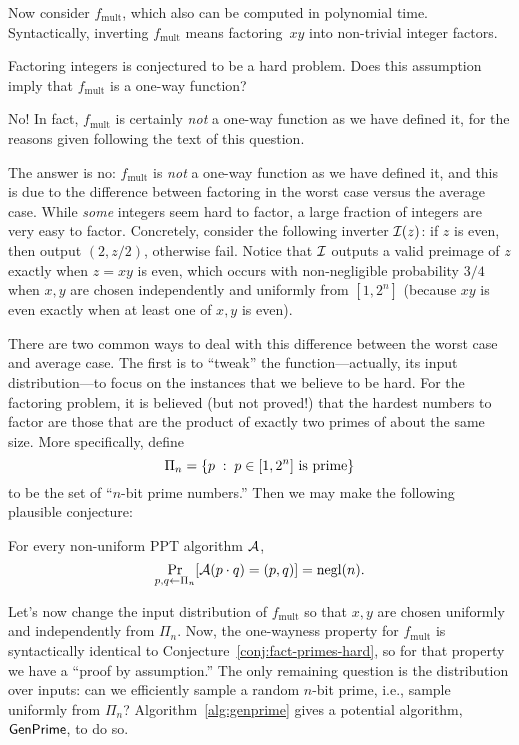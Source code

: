 \documentclass[11pt]{article}
\begin{document}
Now consider $f_{\text{mult}}$, which also can be computed in
polynomial time. Syntactically, inverting $f_{\text{mult}}$ means
factoring~$xy$ into non-trivial integer factors.

\begin{question}
  Factoring integers is conjectured to be a hard problem. Does this
  assumption imply that \(f_{\text{mult}}\) is a one-way function?
\end{question}

\begin{answer}
  No! In fact, \(f_{\text{mult}}\) is certainly \emph{not} a one-way
  function as we have defined it, for the reasons given following the
  text of this question.
\end{answer}

The answer is no: \(f_{\text{mult}}\) is \emph{not} a one-way function
as we have defined it, and this is due to the difference between
factoring in the worst case versus the average case. While \emph{some}
integers seem hard to factor, a large fraction of integers are very
easy to factor. Concretely, consider the following inverter $\mathcal{I}(z)$:
if $z$ is even, then output $(2, z/2)$, otherwise fail.  Notice that
$\mathcal{I}$ outputs a valid preimage of $z$ exactly when $z = xy$ is even,
which occurs with non-negligible probability $3/4$ when $x, y$ are
chosen independently and uniformly from $[1,2^{n}]$ (because $xy$ is
even exactly when at least one of $x,y$ is even).

There are two common ways to deal with this difference between the
worst case and average case.  The first is to ``tweak'' the
function---actually, its input distribution---to focus on the
instances that we believe to be hard.  For the factoring problem, it
is believed (but not proved!) that the hardest numbers to factor are
those that are the product of exactly two primes of about the same
size.  More specifically, define
\[ \Pi_{n} = \{ p\; :\; p \in [1,2^{n}] \text{ is prime}\} \] to be
the set of ``$n$-bit prime numbers.''  Then we may make the following
plausible conjecture:

\begin{conjecture}
  \label{conj:fact-primes-hard}
  For every non-uniform PPT algorithm $\mathcal{A}$,
  \[ \Pr_{p,q \gets \Pi_{n}} [\mathcal{A}(p \cdot q) = (p,q)] = \operatorname{negl}(n). \]
\end{conjecture}

Let's now change the input distribution of $f_{\text{mult}}$ so that
$x,y$ are chosen uniformly and independently from $\Pi_{n}$.  Now, the
one-wayness property for $f_{\text{mult}}$ is syntactically identical
to Conjecture~\ref{conj:fact-primes-hard}, so for that property we
have a ``proof by assumption.''  The only remaining question is the
distribution over inputs: can we efficiently sample a random $n$-bit
prime, i.e., sample uniformly from $\Pi_{n}$?
Algorithm~\ref{alg:genprime} gives a potential algorithm,
$\mathsf{GenPrime}$, to do so.
\end{document}
